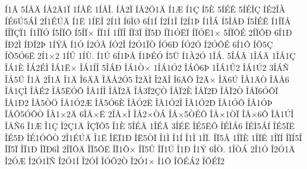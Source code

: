 {^^cd1^^c3
5^^cd^^c5^^c4
^^cd^^c52^^c41^^cf
1^^cd^^c5^^ca
1^^cd^^c5^^ce.
^^cd^^c52^^cf
^^cd^^c52^^d61^^c4
^^cd1^^c6
^^cd1^^c7
^^cd5^^c8
5^^cd^^c9^^ca
5^^cd^^c9^^ce^^c7
^^cd^^c92^^ce^^c0
^^cd^^c96^^da5^^c1^^ce
2^^cd1^^c9^^da^^c4
^^cd1^^cb
1^^cd^^cb^^ce
2^^cd1^^cc
^^cd6^^cc^^d8
6^^cd1^^cd
^^cd2^^cd1^^ce
^^cd2^^cd1^^de
^^cd1^^ce^^c1
^^cd5^^ce^^c5^^d0
^^cd5^^ce^^c9^^ca
^^cd1^^ce^^cf^^c5
^^cd^^ce^^cf^^c7^^cf1
^^cd1^^ce^^cf^^d3
^^cd5^^ce^^cf^^d4
^^cd5^^ce^^cf^^d7
^^cd^^cf1^^cd
1^^cd^^cf^^ce
^^cd^^cf3^^cf
^^cd^^cf5^^d0
^^cd^^cf1^^d3^^cb^^cf
^^cd^^cf^^d3^^cb1^^d7
5^^cd^^cf^^d4^^c9
2^^cd^^cf^^d4^^d0
6^^cd1^^d0
^^cd^^d02^^cc
^^cd^^d0^^cf2^^de
1^^cd^^dd^^c5
^^cd1^^d3
^^cd2^^d3^^c2
^^cd^^d32^^ce
^^cd2^^d31^^cf^^d2
^^cd^^d36^^d0
^^cd^^d32^^d3
^^cd2^^d3^^d4^^c9
6^^cd1^^d4
^^cd^^d55^^c7
^^cd^^d55^^d36^^cb
2^^cd1^^d72
1^^cd^^db
1^^cd^^d9.
^^cd1^^da
6^^cd1^^de^^c5
^^cd1^^de^^c9^^d3
^^cd5^^dc
^^cd1^^c02^^d3
1^^ce^^c1.
5^^ce^^c1^^c3
1^^ce^^c1^^c4
1^^ce^^c11^^c7
^^ce^^c11^^c8
^^ce^^c12^^c9^^cc
^^ce^^c11^^cb^^d7
^^ce^^c11^^cd^^ce
5^^ce^^c1^^d0
^^ce^^c11^^d2^^d7
1^^ce^^c11^^d32
^^ce^^c1^^d56^^de
1^^ce^^c11^^db2
^^ce^^c11^^da2
3^^ce^^c1^^d1
^^ce^^c15^^dc
^^ce1^^c2
2^^ce1^^c3
^^ce1^^c4
^^ce6^^c4^^c3
^^ce^^c4^^c52^^d35
^^ce2^^c4^^cc
^^ce2^^c4^^ce
^^ce6^^c4^^d4
^^ce2^^c4^^d7
^^ce^^c46^^da
^^ce^^c51^^c4^^d2
^^ce^^c5^^c56
^^ce^^c51^^c7^^cc
^^ce^^c5^^c92
^^ce^^c55^^cb^^d3^^d4
^^ce^^c51^^cd^^ce
^^ce^^c5^^cf2^^c3
^^ce^^c53^^cf2^^c7^^d2
^^ce^^c5^^cf2^^c8
^^ce^^c5^^cf2^^d0
^^ce^^c5^^cf2^^d2
^^ce^^c5^^cf6^^d3^^d4^^cf
^^ce^^c51^^d02
^^ce^^c55^^d2^^d6
^^ce^^c51^^d32^^c6
^^ce^^c55^^d36^^c8
^^ce^^c5^^d32^^cb
^^ce^^c51^^d32^^ce
^^ce^^c51^^d32^^d0
^^ce^^c51^^d3^^d4
^^ce^^c51^^d3^^de
^^ce^^c5^^d55^^d3^^d4^^d2
^^ce^^c51^^d72^^c4
6^^ce^^c5^^d7^^cb
2^^ce^^c5^^d7^^ce
^^ce^^c52^^d7^^d2^^c1
^^ce^^c5^^d75^^d2^^c9^^d4
^^ce^^c5^^d71^^d2^^cf
^^ce^^c5^^d76^^d4
^^ce^^c51^^da^^ce
^^ce^^c5^^d16
^^ce1^^c6
^^ce1^^c7
^^ce2^^c71^^c4
^^ce^^c7^^cf^^d55
^^ce1^^c8
5^^ce^^c9^^c2
1^^ce^^c9^^c3
3^^ce^^c9^^cb
^^ce^^c95^^cb^^d4
^^ce^^c9^^cc^^c16
^^ce^^c9^^cc5^^c1^^cd
^^ce^^c95^^cf^^cb
^^ce^^c95^^d0
^^ce^^c91^^d3^^d4^^d2
2^^ce1^^c9^^da^^c4
^^ce1^^cb
^^ce^^cb^^cf1^^d0
^^ce^^cb5^^d2^^cf
^^ce1^^cc
^^ce1^^cd
^^ce1^^ce
1^^ce^^cf.
^^ce^^cf5^^c5
1^^ce^^cf^^c8
1^^ce^^cf^^ca
1^^ce^^cf^^cd
^^ce^^cf^^cd5^^ce
^^ce^^cf5^^cf
^^ce^^cf1^^d0
^^ce^^cf^^d06^^cc
2^^ce^^cf^^d4^^c4
^^ce^^cf5^^d4^^cb
^^ce^^cf1^^d4^^d7
^^ce^^cf5^^db
^^ce^^cf1^^da
^^ce1^^d0
^^ce1^^dd
6^^ce^^d2.
1^^ce^^d2^^c1
2^^ce1^^d3
^^ce2^^d31^^c4
^^ce2^^d3^^c6
^^ce2^^d31^^cc^^d1
^^ce2^^d31^^cd
^^ce2^^d3^^ce
^^ce^^d3^^d52^^d2
^^ce2^^d31^^d7
^^ce1^^d4
^^ce^^d4^^c9^^c12
^^ce^^d4^^c9^^cf2
}
